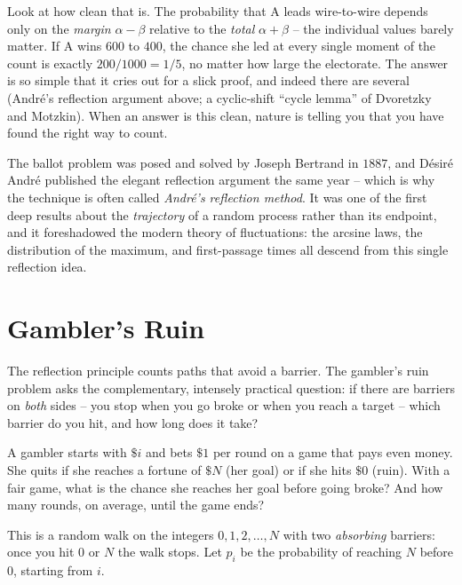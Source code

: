 \begin{aestheticbox}
Look at how clean that is. The probability that A leads wire-to-wire depends
only on the \emph{margin} $\alpha - \beta$ relative to the \emph{total}
$\alpha + \beta$ -- the individual values barely matter. If A wins $600$ to
$400$, the chance she led at every single moment of the count is exactly
$200/1000 = 1/5$, no matter how large the electorate. The answer is so simple
that it cries out for a slick proof, and indeed there are several (Andr\'e's
reflection argument above; a cyclic-shift ``cycle lemma'' of Dvoretzky and
Motzkin). When an answer is this clean, nature is telling you that you have
found the right way to count.
\end{aestheticbox}

\begin{historybox}
The ballot problem was posed and solved by Joseph Bertrand in $1887$, and
D\'esir\'e Andr\'e published the elegant reflection argument the same year --
which is why the technique is often called \emph{Andr\'e's reflection
method}. It was one of the first deep results about the \emph{trajectory} of a
random process rather than its endpoint, and it foreshadowed the modern theory
of fluctuations: the arcsine laws, the distribution of the maximum, and
first-passage times all descend from this single reflection idea.
\end{historybox}

\section{Gambler's Ruin}
\label{ch26:ruin}

The reflection principle counts paths that avoid a barrier. The gambler's ruin
problem asks the complementary, intensely practical question: if there are
barriers on \emph{both} sides -- you stop when you go broke or when you reach a
target -- which barrier do you hit, and how long does it take?

\begin{walkbox}
A gambler starts with $\$i$ and bets $\$1$ per round on a game that pays even
money. She quits if she reaches a fortune of $\$N$ (her goal) or if she hits
$\$0$ (ruin). With a fair game, what is the chance she reaches her goal before
going broke? And how many rounds, on average, until the game ends?
\end{walkbox}

This is a random walk on the integers $0, 1, 2, \dots, N$ with two
\emph{absorbing} barriers: once you hit $0$ or $N$ the walk stops. Let $p_i$ be
the probability of reaching $N$ before $0$, starting from $i$.

